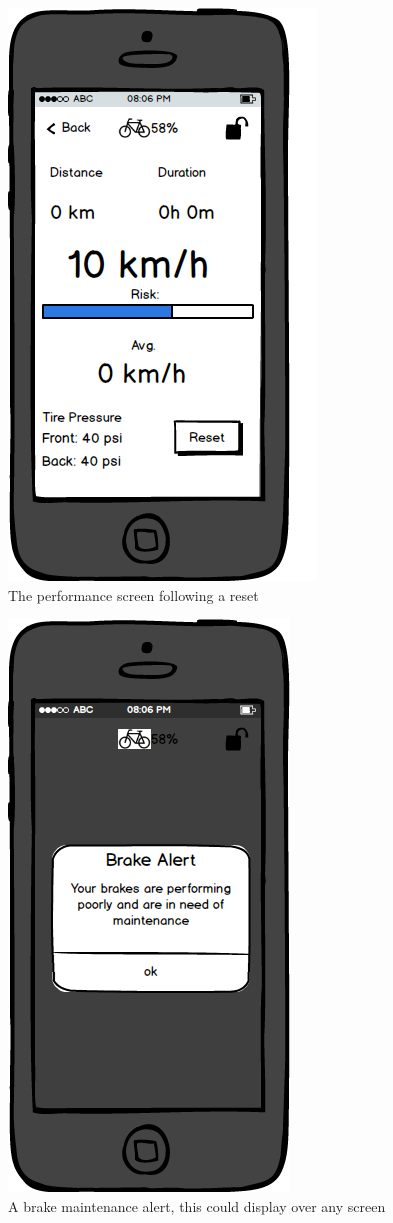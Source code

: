 \documentclass[a4paper]{report}
\begin{document}
\clearpage
\begin{figure}
\centering
\includegraphics[scale=0.9]{figures/prototype_2/performance_resetted}
\caption{The performance screen following a reset}
\end{figure}
\clearpage
\begin{figure}
\centering
\includegraphics[scale=0.9]{figures/prototype_2/brake_maintenance}
\caption{A brake maintenance alert, this could display over any screen}
\end{figure}
\end{document}

